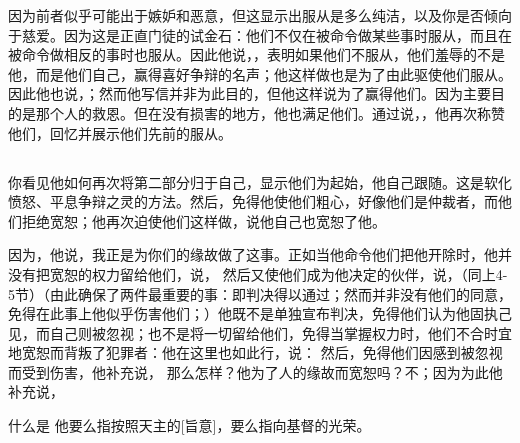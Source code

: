 因为前者似乎可能出于嫉妒和恶意，但这显示出服从是多么纯洁，以及你是否倾向于慈爱。因为这是正直门徒的试金石：他们不仅在被命令做某些事时服从，而且在被命令做相反的事时也服从。因此他说，，表明如果他们不服从，他们羞辱的不是他，而是他们自己，赢得喜好争辩的名声；他这样做也是为了由此驱使他们服从。因此他也说，；然而他写信并非为此目的，但他这样说为了赢得他们。因为主要目的是那个人的救恩。但在没有损害的地方，他也满足他们。通过说，，他再次称赞他们，回忆并展示他们先前的服从。\par


\subsection{}

\par

你看见他如何再次将第二部分归于自己，显示他们为起始，他自己跟随。这是软化愤怒、平息争辩之灵的方法。然后，免得他使他们粗心，好像他们是仲裁者，而他们拒绝宽恕；他再次迫使他们这样做，说他自己也宽恕了他。\par

 因为，他说，我正是为你们的缘故做了这事。正如当他命令他们把他开除时，他并没有把宽恕的权力留给他们，说，  然后又使他们成为他决定的伙伴，说，（同上4-5节）（由此确保了两件最重要的事：即判决得以通过；然而并非没有他们的同意，免得在此事上他似乎伤害他们；）他既不是单独宣布判决，免得他们认为他固执己见，而自己则被忽视；也不是将一切留给他们，免得当掌握权力时，他们不合时宜地宽恕而背叛了犯罪者：他在这里也如此行，说： 然后，免得他们因感到被忽视而受到伤害，他补充说， 那么怎样？他为了人的缘故而宽恕吗？不；因为为此他补充说，\par

什么是 他要么指按照天主的[旨意]，要么指向基督的光荣。\par


\subsection{}

